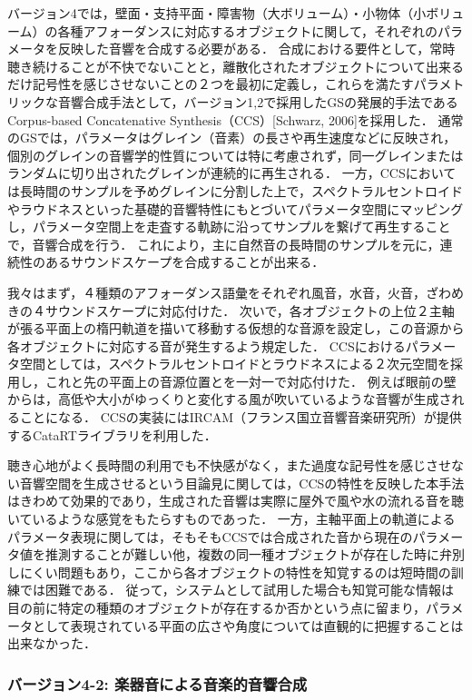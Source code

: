バージョン4では，壁面・支持平面・障害物（大ボリューム）・小物体（小ボリューム）の各種アフォーダンスに対応するオブジェクトに関して，それぞれのパラメータを反映した音響を合成する必要がある．
合成における要件として，常時聴き続けることが不快でないことと，離散化されたオブジェクトについて出来るだけ記号性を感じさせないことの２つを最初に定義し，これらを満たすパラメトリックな音響合成手法として，バージョン1,2で採用したGSの発展的手法であるCorpus-based Concatenative Synthesis（CCS）[Schwarz, 2006]を採用した．
通常のGSでは，パラメータはグレイン（音素）の長さや再生速度などに反映され，個別のグレインの音響学的性質については特に考慮されず，同一グレインまたはランダムに切り出されたグレインが連続的に再生される．
一方，CCSにおいては長時間のサンプルを予めグレインに分割した上で，スペクトラルセントロイドやラウドネスといった基礎的音響特性にもとづいてパラメータ空間にマッピングし，パラメータ空間上を走査する軌跡に沿ってサンプルを繋げて再生することで，音響合成を行う．
これにより，主に自然音の長時間のサンプルを元に，連続性のあるサウンドスケープを合成することが出来る．

我々はまず，４種類のアフォーダンス語彙をそれぞれ風音，水音，火音，ざわめきの４サウンドスケープに対応付けた．
次いで，各オブジェクトの上位２主軸が張る平面上の楕円軌道を描いて移動する仮想的な音源を設定し，この音源から各オブジェクトに対応する音が発生するよう規定した．
CCSにおけるパラメータ空間としては，スペクトラルセントロイドとラウドネスによる２次元空間を採用し，これと先の平面上の音源位置とを一対一で対応付けた．
例えば眼前の壁からは，高低や大小がゆっくりと変化する風が吹いているような音響が生成されることになる．
CCSの実装にはIRCAM（フランス国立音響音楽研究所）が提供するCataRTライブラリを利用した．

聴き心地がよく長時間の利用でも不快感がなく，また過度な記号性を感じさせない音響空間を生成させるという目論見に関しては，CCSの特性を反映した本手法はきわめて効果的であり，生成された音響は実際に屋外で風や水の流れる音を聴いているような感覚をもたらすものであった．
一方，主軸平面上の軌道によるパラメータ表現に関しては，そもそもCCSでは合成された音から現在のパラメータ値を推測することが難しい他，複数の同一種オブジェクトが存在した時に弁別しにくい問題もあり，ここから各オブジェクトの特性を知覚するのは短時間の訓練では困難である．
従って，システムとして試用した場合も知覚可能な情報は目の前に特定の種類のオブジェクトが存在するか否かという点に留まり，パラメータとして表現されている平面の広さや角度については直観的に把握することは出来なかった．

\subsubsection{バージョン4-2: 楽器音による音楽的音響合成}

